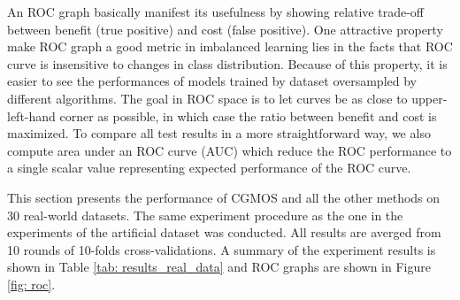 \documentclass{iitthesis}
\begin{document}
An ROC graph basically manifest its usefulness by showing relative trade-off between benefit (true positive) and cost (false positive). One attractive property make ROC graph a good metric in imbalanced learning lies in the facts that ROC curve is insensitive to changes in class distribution. Because of this property, it is easier to see the performances of models trained by dataset oversampled by different algorithms. The goal in ROC space is to let curves be as close to upper-left-hand corner as possible, in which case the ratio between benefit and cost is maximized. To compare all test results in a more straightforward way, we also compute area under an ROC curve (AUC) which reduce the ROC performance to a single scalar value representing expected performance of the ROC curve.
 
This section presents the performance of CGMOS and all the other methods on 30 real-world datasets. The same experiment procedure as the one in the experiments of the artificial dataset was conducted. All results are averged from 10 rounds of 10-folds cross-validations. A summary of the experiment results is shown in Table \ref{tab: results_real_data} and ROC graphs are shown in Figure \ref{fig: roc}.

\begin{table}[ht]
\caption{A summary of $p$-values of statistical significant tests of classification results using CGMOS against each of all the other competitors. }
\begin{center}
\end{center}
\label{tab: signrank}
\end{table}
\end{document}
